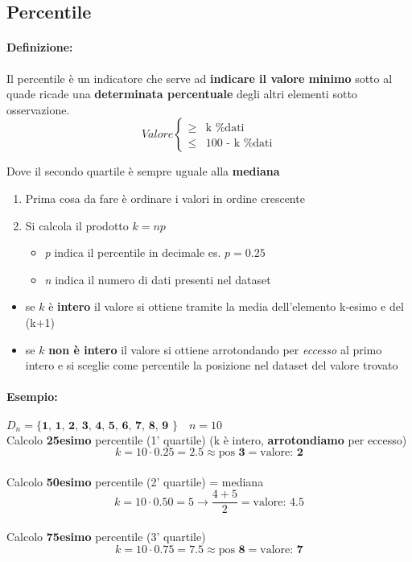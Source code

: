 \documentclass[]{article}
\newcommand{\definizione}{\paragraph{Definizione:}}
\begin{document}
    \subsection{Percentile}
    \definizione Il percentile è un indicatore che serve ad \textbf{indicare il valore minimo} sotto al quade ricade una \textbf{determinata percentuale} degli altri elementi sotto osservazione.
    \begin{equation*}
        Valore
        \begin{cases}
            \geq & \text{k \% dati} \\
            \leq & \text{100 - k \% dati}
        \end{cases}
    \end{equation*}
    \centerline{Dove il secondo quartile è sempre uguale alla \textbf{mediana}}
    \begin{enumerate}
        \item Prima cosa da fare è ordinare i valori in ordine crescente
        \item Si calcola il prodotto $k = np$
        \begin{itemize}
            \item \textit{p} indica il percentile in decimale es. $p=0.25$
            \item \textit{n} indica il numero di dati presenti nel dataset
        \end{itemize}
    \end{enumerate}
    \begin{itemize}
        \item se $k$ è \textbf{intero} il valore si ottiene  tramite la media dell'elemento k-esimo e del (k+1)
        \item se $k$ \textbf{non è intero} il valore si ottiene arrotondando per \textit{eccesso} al primo intero e si sceglie come percentile la posizione nel dataset del valore trovato
    \end{itemize}

    \paragraph{Esempio:} $D_n = \textbf{\{ 1, 1, 2, 3, 4, 5, 6, 7, 8, 9 \}} \quad n=10$ \\
    Calcolo \textbf{25esimo} percentile (1' quartile) (k è intero, \textbf{arrotondiamo} per eccesso)
    \[ k = 10 \cdot 0.25 = 2.5 \approx \text{pos } \boldsymbol{3} = \text{valore: } \boldsymbol{2}\] \\
    Calcolo \textbf{50esimo} percentile (2' quartile) = mediana
    \[ k = 10 \cdot 0.50 = 5 \longrightarrow \frac{4+5}{2} = \text{valore: } \boldsymbol{4.5}\] \\
    Calcolo \textbf{75esimo} percentile (3' quartile)
    \[ k = 10 \cdot 0.75 = 7.5 \approx \text{pos } \boldsymbol{8} = \text{valore: } \boldsymbol{7} \]
\end{document}

